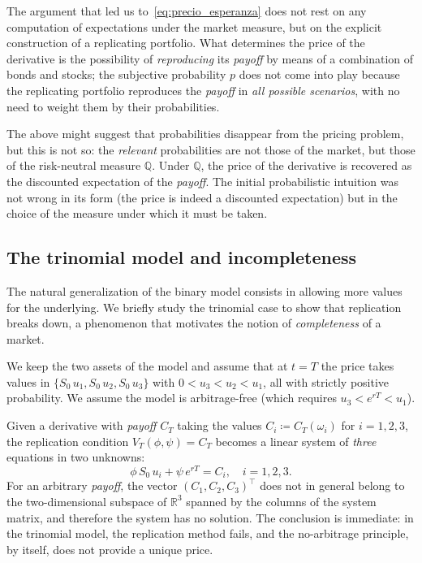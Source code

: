 \documentclass[11pt,a4paper,oneside]{report}
\theoremstyle{plain}
\theoremstyle{definition}
\theoremstyle{remark}
\newcommand{\R}{\mathbb{R}}
\newcommand{\Q}{\mathbb{Q}}
\newcommand{\1}{\mathbf{1}}
\newcommand{\eqdef}{\coloneqq}
\begin{document}
The
argument that led us to~\eqref{eq:precio_esperanza} does not rest on
any computation of expectations under the market measure, but on the
explicit construction of a replicating portfolio. What determines the
price of the derivative is the possibility of \emph{reproducing} its
\emph{payoff} by means of a combination of bonds and stocks; the
subjective probability $p$ does not come into play because the
replicating portfolio reproduces the \emph{payoff} in \emph{all
possible scenarios}, with no need to weight them by their
probabilities.

The above
might suggest that probabilities disappear from the pricing problem,
but this is not so: the \emph{relevant} probabilities are not those
of the market, but those of the risk-neutral measure $\Q$. Under
$\Q$, the price of the derivative is recovered as the discounted
expectation of the \emph{payoff}. The initial probabilistic intuition
was not wrong in its form (the price is indeed a discounted
expectation) but in the choice of the measure under which it must be
taken.

\subsection{The trinomial model and incompleteness}
\label{subsec:ternario}

The natural generalization of the binary model consists in allowing
more values for the underlying. We briefly study the trinomial case
to show that replication breaks down, a phenomenon that motivates the
notion of \emph{completeness} of a market.

\medskip

We keep the two assets of the model and assume that at $t = T$ the
price takes values in $\{S_0\, u_1, S_0\, u_2, S_0\, u_3\}$ with
$0 < u_3 < u_2 < u_1$, all with strictly positive probability. We
assume the model is arbitrage-free (which requires
$u_3 < e^{rT} < u_1$).

Given a derivative with \emph{payoff} $C_T$ taking the values
$C_i \eqdef C_T(\omega_i)$ for $i = 1, 2, 3$, the replication
condition $V_T(\phi, \psi) = C_T$ becomes a linear system of
\emph{three} equations in two unknowns:
\begin{equation*}
  \phi\, S_0\, u_i + \psi\, e^{rT} = C_i, \quad i = 1, 2, 3.
\end{equation*}
For an arbitrary \emph{payoff}, the vector $(C_1, C_2, C_3)^\top$ does
not in general belong to the two-dimensional subspace of $\R^3$
spanned by the columns of the system matrix, and therefore the system
has no solution. The conclusion is immediate: in the trinomial model,
the replication method fails, and the no-arbitrage principle, by
itself, does not provide a unique price.
\end{document}
